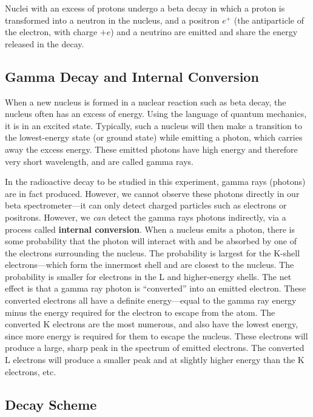 Nuclei with an excess of protons undergo a beta decay in which a
proton is transformed into a neutron in the nucleus, and a positron
$e^+$ (the antiparticle of the
electron, with charge $+e$) and a neutrino are emitted and share the
energy released in the decay.


\subsection{Gamma Decay and Internal Conversion}


When a new nucleus is formed in a nuclear reaction such as beta decay,
the nucleus often has an excess of energy.  Using the language of
quantum mechanics, it is in an excited state.  Typically, such a
nucleus will then make a transition to the lowest-energy state  (or
ground state) while emitting a photon, which carries away the excess
energy.  These emitted photons have high energy and therefore very
short wavelength, and are called gamma rays.


In the radioactive decay to be studied in this experiment, gamma
rays (photons) are in fact produced.  However, we cannot observe these
photons directly in our beta spectrometer---it can only detect charged
particles such as electrons or positrons.  However, we
{\em can} detect the gamma rays photons indirectly, via a
process called {\bf internal conversion}.  When a nucleus
emits a photon, there is some probability that the photon will interact with and
be absorbed by one of the electrons surrounding the nucleus.  The
probability is largest for the K-shell electrons---which form the
innermost shell and are closest to the nucleus.  The probability is
smaller for electrons in the L and higher-energy shells.  The net
effect is that a gamma ray photon is
``converted'' into an emitted electron.
 These converted electrons all have a definite energy---equal to the
gamma ray energy minus the energy required for the electron to escape
from the atom.  The converted K electrons are the most numerous, and
also have the lowest energy, since more energy is required for them to
escape the nucleus.  These electrons will produce a large, sharp
peak in the spectrum of emitted electrons.  The converted L electrons
will produce a smaller peak and at slightly higher energy than the K
electrons, etc.


\subsection{\cs Decay Scheme}


